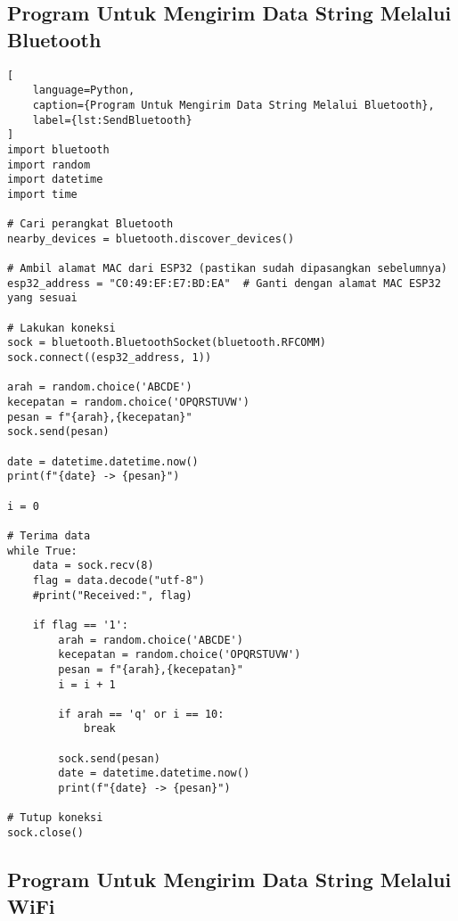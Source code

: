 \subsection*{Program Untuk Mengirim Data String Melalui Bluetooth}

\begin{lstlisting}[
    language=Python,
    caption={Program Untuk Mengirim Data String Melalui Bluetooth},
    label={lst:SendBluetooth}
]
import bluetooth
import random
import datetime
import time

# Cari perangkat Bluetooth
nearby_devices = bluetooth.discover_devices()

# Ambil alamat MAC dari ESP32 (pastikan sudah dipasangkan sebelumnya)
esp32_address = "C0:49:EF:E7:BD:EA"  # Ganti dengan alamat MAC ESP32 yang sesuai

# Lakukan koneksi
sock = bluetooth.BluetoothSocket(bluetooth.RFCOMM)
sock.connect((esp32_address, 1))

arah = random.choice('ABCDE')
kecepatan = random.choice('OPQRSTUVW')
pesan = f"{arah},{kecepatan}"
sock.send(pesan)

date = datetime.datetime.now()
print(f"{date} -> {pesan}")

i = 0

# Terima data
while True:
    data = sock.recv(8)
    flag = data.decode("utf-8")
    #print("Received:", flag)
    
    if flag == '1':
        arah = random.choice('ABCDE')
        kecepatan = random.choice('OPQRSTUVW')
        pesan = f"{arah},{kecepatan}"
        i = i + 1
        
        if arah == 'q' or i == 10:
            break
        
        sock.send(pesan)
        date = datetime.datetime.now()
        print(f"{date} -> {pesan}")
        
# Tutup koneksi
sock.close()
\end{lstlisting}

\subsection*{Program Untuk Mengirim Data String Melalui WiFi}

